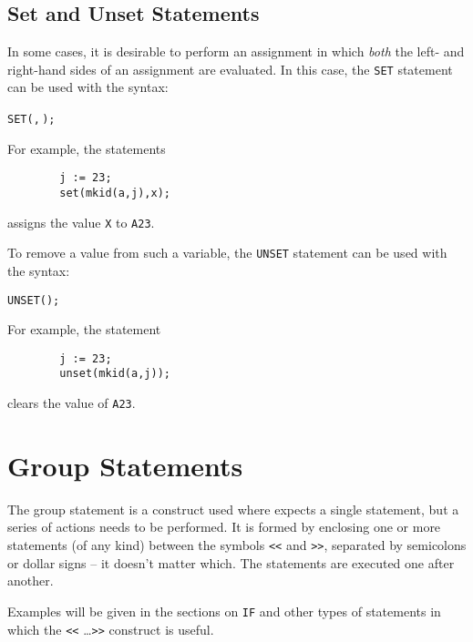 \subsection{Set and Unset Statements}
\hypertarget{command:SET}{}
\hypertarget{command:UNSET}{}

In some cases, it is desirable to perform an assignment in which \emph{both}
the left- and right-hand sides of an assignment are
evaluated.  In this case, the \texttt{SET} statement can
be used with the syntax:
\begin{syntax}
  \texttt{SET(}\texttt{,}\,\texttt{);}
\end{syntax}
For example, the statements
\begin{verbatim}
        j := 23;
        set(mkid(a,j),x);
\end{verbatim}
assigns the value \texttt{X} to \texttt{A23}.

To remove a value from such a variable, the \texttt{UNSET}
statement can be used with the syntax:
\begin{syntax}
        \texttt{UNSET(}\texttt{);}
\end{syntax}
For example, the statement
\begin{verbatim}
        j := 23;
        unset(mkid(a,j));
\end{verbatim}
clears the value of \texttt{A23}.

\section{Group Statements}

The group statement
 is a construct used where
{\REDUCE} expects a single statement, but a series of actions needs to be
performed.  It is formed by enclosing one or more statements (of any kind)
between the symbols \texttt{<}\texttt{<} and \texttt{>}\texttt{>}, 
separated by semicolons or
dollar signs -- it doesn't matter which.  The statements are executed one
after another.

Examples will be given in the sections on \texttt{IF} and other
types of statements in which the \texttt{<}\texttt{<} \ldots \texttt{>}\texttt{>} 
construct is useful.

